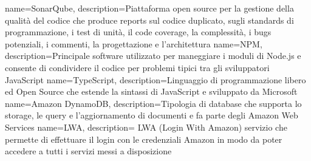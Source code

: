  {
	name=SonarQube,
	description={Piattaforma open source per la gestione della qualità del codice che produce reports sul codice duplicato, sugli standards di programmazione, i test di unità, il code coverage, la complessità, i bugs potenziali, i commenti, la progettazione e l’architettura}
}
 {
	name=NPM,
	description={Principale software utilizzato per maneggiare i moduli di Node.js e consente di condividere il codice per problemi tipici tra gli sviluppatori JavaScript}
}
 {
	name=TypeScript,
	description={Linguaggio di programmazione libero ed Open Source che estende la sintassi di JavaScript e sviluppato da Microsoft}
}
 {
	name=Amazon DynamoDB,
	description={Tipologia di database che supporta lo storage, le query e l'aggiornamento di documenti e fa parte degli Amazon Web Services}
}
 {
	name=LWA,
	description={ LWA (Login With Amazon) servizio che permette di effettuare il login con le credenziali Amazon in modo da poter accedere a tutti i servizi messi a disposizione}
}